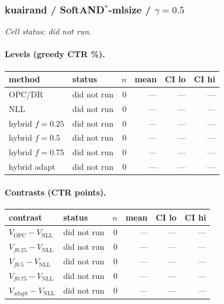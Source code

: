 \documentclass[10pt,a4paper]{article}
\begin{document}
\subsubsection{kuairand / SoftAND$^*$-mlsize / $\gamma=0.5$}
\emph{Cell status: did not run}.
\paragraph{Levels (greedy CTR \%).}
{\centering\small\begin{tabular}{llrrrr}
\toprule method & status & $n$ & mean & CI lo & CI hi \\
\midrule
OPC/DR & did not run & 0 & --- & --- & --- \\
NLL & did not run & 0 & --- & --- & --- \\
hybrid $f{=}0.25$ & did not run & 0 & --- & --- & --- \\
hybrid $f{=}0.5$ & did not run & 0 & --- & --- & --- \\
hybrid $f{=}0.75$ & did not run & 0 & --- & --- & --- \\
hybrid adapt & did not run & 0 & --- & --- & --- \\
\bottomrule\end{tabular}\par}
\paragraph{Contrasts (CTR points).}
{\centering\small\begin{tabular}{llrrrr}
\toprule contrast & status & $n$ & mean & CI lo & CI hi \\
\midrule
$V_{\mathrm{OPC}}-V_{\mathrm{NLL}}$ & did not run & 0 & --- & --- & --- \\
$V_{f0.25}-V_{\mathrm{NLL}}$ & did not run & 0 & --- & --- & --- \\
$V_{f0.5}-V_{\mathrm{NLL}}$ & did not run & 0 & --- & --- & --- \\
$V_{f0.75}-V_{\mathrm{NLL}}$ & did not run & 0 & --- & --- & --- \\
$V_{\mathrm{adapt}}-V_{\mathrm{NLL}}$ & did not run & 0 & --- & --- & --- \\
\bottomrule\end{tabular}\par}
\end{document}
